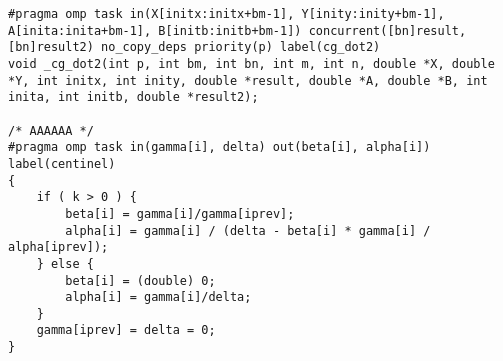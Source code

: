 \begin{appendices}
\begin{lstlisting}
#pragma omp task in(X[initx:initx+bm-1], Y[inity:inity+bm-1], A[inita:inita+bm-1], B[initb:initb+bm-1]) concurrent([bn]result, [bn]result2) no_copy_deps priority(p) label(cg_dot2)
void _cg_dot2(int p, int bm, int bn, int m, int n, double *X, double *Y, int initx, int inity, double *result, double *A, double *B, int inita, int initb, double *result2);

/* AAAAAA */
#pragma omp task in(gamma[i], delta) out(beta[i], alpha[i]) label(centinel) 
{
    if ( k > 0 ) {
        beta[i] = gamma[i]/gamma[iprev];
        alpha[i] = gamma[i] / (delta - beta[i] * gamma[i] / alpha[iprev]);
    } else {
        beta[i] = (double) 0;
        alpha[i] = gamma[i]/delta;
    }
    gamma[iprev] = delta = 0;
}  
\end{lstlisting}
\end{appendices}

